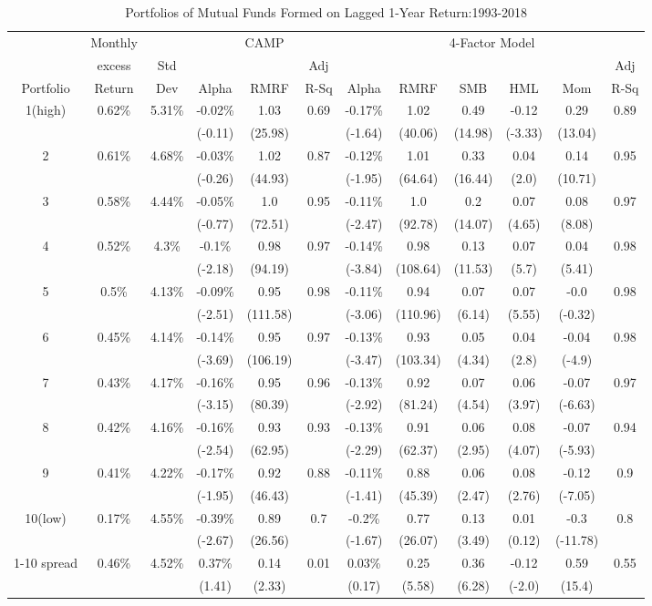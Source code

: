 \documentclass[a4paper]{article}
\begin{document}
\begin{table}[h!]
    \centering
    \begin{tabular}{c cc ccc cccccc} 
    \toprule[1.5pt]
      &  Monthly &  & \multicolumn{3}{c}{CAMP} &  \multicolumn{6}{c}{4-Factor Model}\\
      & excess& Std &   &  & Adj &   &  &  &  &  & Adj\\
     Portfolio & Return & Dev & Alpha  & RMRF & R-Sq &  Alpha  & RMRF & SMB & HML & Mom &  R-Sq\\
    
    \toprule[1.5pt]
    1(high)&0.62\%&5.31\%&-0.02\%&1.03&0.69&-0.17\%&1.02&0.49&-0.12&0.29&0.89\\
    &&&(-0.11)&(25.98)&&(-1.64)&(40.06)&(14.98)&(-3.33)&(13.04)&\\
    2&0.61\%&4.68\%&-0.03\%&1.02&0.87&-0.12\%&1.01&0.33&0.04&0.14&0.95\\
    &&&(-0.26)&(44.93)&&(-1.95)&(64.64)&(16.44)&(2.0)&(10.71)&\\
    3&0.58\%&4.44\%&-0.05\%&1.0&0.95&-0.11\%&1.0&0.2&0.07&0.08&0.97\\
    &&&(-0.77)&(72.51)&&(-2.47)&(92.78)&(14.07)&(4.65)&(8.08)&\\
    4&0.52\%&4.3\%&-0.1\%&0.98&0.97&-0.14\%&0.98&0.13&0.07&0.04&0.98\\
    &&&(-2.18)&(94.19)&&(-3.84)&(108.64)&(11.53)&(5.7)&(5.41)&\\
    5&0.5\%&4.13\%&-0.09\%&0.95&0.98&-0.11\%&0.94&0.07&0.07&-0.0&0.98\\
    &&&(-2.51)&(111.58)&&(-3.06)&(110.96)&(6.14)&(5.55)&(-0.32)&\\
    6&0.45\%&4.14\%&-0.14\%&0.95&0.97&-0.13\%&0.93&0.05&0.04&-0.04&0.98\\
    &&&(-3.69)&(106.19)&&(-3.47)&(103.34)&(4.34)&(2.8)&(-4.9)&\\
    7&0.43\%&4.17\%&-0.16\%&0.95&0.96&-0.13\%&0.92&0.07&0.06&-0.07&0.97\\
    &&&(-3.15)&(80.39)&&(-2.92)&(81.24)&(4.54)&(3.97)&(-6.63)&\\
    8&0.42\%&4.16\%&-0.16\%&0.93&0.93&-0.13\%&0.91&0.06&0.08&-0.07&0.94\\
    &&&(-2.54)&(62.95)&&(-2.29)&(62.37)&(2.95)&(4.07)&(-5.93)&\\
    9&0.41\%&4.22\%&-0.17\%&0.92&0.88&-0.11\%&0.88&0.06&0.08&-0.12&0.9\\
    &&&(-1.95)&(46.43)&&(-1.41)&(45.39)&(2.47)&(2.76)&(-7.05)&\\
    10(low)&0.17\%&4.55\%&-0.39\%&0.89&0.7&-0.2\%&0.77&0.13&0.01&-0.3&0.8\\
    &&&(-2.67)&(26.56)&&(-1.67)&(26.07)&(3.49)&(0.12)&(-11.78)&\\
    1-10 spread&0.46\%&4.52\%&0.37\%&0.14&0.01&0.03\%&0.25&0.36&-0.12&0.59&0.55\\
    &&&(1.41)&(2.33)&&(0.17)&(5.58)&(6.28)&(-2.0)&(15.4)&\\
    
    \toprule[1.5pt]
    \end{tabular}
    \caption{Portfolios of Mutual Funds Formed on Lagged 1-Year Return:1993-2018}
    \label{table:1}
    \end{table}
\end{document}
